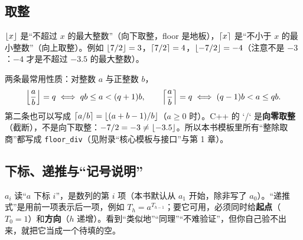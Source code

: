 \subsection{取整}
$\left\lfloor x\right\rfloor$ 是“不超过 $x$ 的最大整数”（向下取整，floor 是地板），$\left\lceil x\right\rceil$ 是“不小于 $x$ 的最小整数”（向上取整）。例如 $\left\lfloor 7/2\right\rfloor=3$，$\left\lceil 7/2\right\rceil=4$，$\left\lfloor -7/2\right\rfloor=-4$（注意不是 $-3$：$-4$ 才是不超过 $-3.5$ 的最大整数）。

两条最常用性质：对整数 $a$ 与正整数 $b$，
\[
\left\lfloor \frac{a}{b}\right\rfloor=q\iff qb\le a<(q+1)b,\qquad \left\lceil \frac{a}{b}\right\rceil=q\iff (q-1)b<a\le qb.
\]
第二条也可以写成 $\left\lceil a/b\right\rceil=\left\lfloor (a+b-1)/b\right\rfloor$（$a\ge0$ 时）。C++ 的 `/` 是\textbf{向零取整}（截断），不是向下取整：$-7/2=-3\ne\left\lfloor -3.5\right\rfloor$。所以本书模板里所有“整除取商”都写成 \texttt{floor\_div}（见附录“核心模板与接口”与第 1 章）。

\subsection{下标、递推与“记号说明”}
$a_i$ 读“$a$ 下标 $i$”，是数列的第 $i$ 项（本书默认从 $a_1$ 开始，除非写了 $a_0$）。“递推式”是用前一项表示后一项，例如 $T_h=a^{T_{h-1}}$；要它可用，必须同时给\textbf{起点}（$T_0=1$）和\textbf{方向}（$h$ 递增）。看到“类似地”“同理”“不难验证”，但你自己验不出来，就把它当成一个待填的空。

